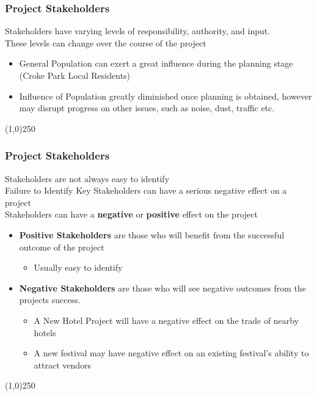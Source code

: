 \begin{frame}
\frametitle{Project Stakeholders}
Stakeholders have varying levels of responsibility, authority, and input.\\
These levels can change over the course of the project\\
\begin{itemize}
	\item General Population can exert a great influence during the planning stage (Croke Park Local Residents)
	\item Influence of Population greatly diminished once planning is obtained, however may disrupt progress on other issues, such as noise, dust, traffic etc.
\end{itemize}
\end{frame}
\begin{center}\line(1,0){250}\end{center}



\begin{frame}
\frametitle{Project Stakeholders}
Stakeholders are not always easy to identify\\
Failure to Identify Key Stakeholders can have a serious negative effect on a project\\
Stakeholders can have a \textbf{negative} or \textbf{positive} effect on the project\\
\begin{itemize}
	\item \textbf{Positive Stakeholders} are those who will benefit from the successful outcome of the project
	\begin{itemize}
		\item Usually easy to identify
	\end{itemize}
	\item \textbf{Negative Stakeholders} are those who will see negative outcomes from the projects success.
	\begin{itemize}
		\item A New Hotel Project will have a negative effect on the trade of nearby hotels
		\item A new festival may have negative effect on an existing festival's ability to attract vendors
	\end{itemize}
\end{itemize}
\end{frame}
\begin{center}\line(1,0){250}\end{center}



